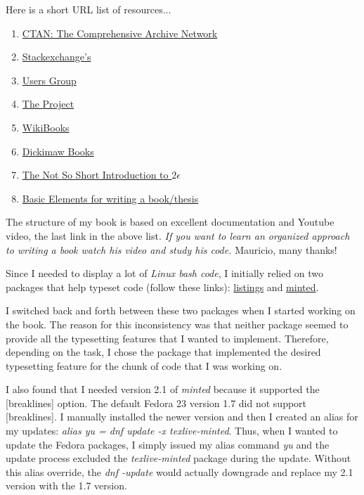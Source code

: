 Here is a short URL list of \latex resources...

\begin{enumerate}
	\item{\href{https://www.ctan.org/}{CTAN: The Comprehensive \tex Archive Network}}
	\item{\href{https://tex.stackexchange.com/}{Stackexchange's \tex}}
	\item{\href{https://www.tug.org/}{\tex Users Group}}
	\item{\href{https://www.latex-project.org/}{The \latex Project}}
	\item{\href{https://en.wikibooks.org/wiki/LaTeX}{\latex WikiBooks}}
	\item{\href{http://www.dickimaw-books.com/latexresources.html}{Dickimaw Books \latex}}
	\item{\href{http://mirror.its.dal.ca/ctan/info/lshort/english/}{The Not So Short Introduction to \latex\begin{math}2\epsilon\end{math}}}
	\item{\href{https://www.youtube.com/watch?v=Qjp-a2uZWZc}{\latex Basic Elements for writing a book/thesis}}
\end{enumerate}

The structure of my book is based on  excellent documentation and Youtube video, the last link in the above list. \textit{If you want to learn an organized approach to writing a \latex book watch his video and study his code.} Mauricio, many thanks!

Since I needed to display a lot of \emph{Linux bash code}, I initially relied on two \latex packages that help typeset code (follow these links): \href{https://www.ctan.org/pkg/listings?lang=en}{listings} and  \href{https://www.ctan.org/tex-archive/macros/latex/contrib/minted?lang=en}{minted}. 

I switched back and forth between these two packages when I started working on the book. The reason for this inconsistency was that neither package seemed to provide all the typesetting features that I wanted to implement. Therefore, depending on the task, I chose the package that implemented the desired typesetting feature for the chunk of code that I was working on.

I also found that I needed version 2.1 of \emph{minted} because it supported the [breaklines] option. The default Fedora 23 \latex version 1.7 did not support [breaklines]. I manually installed the newer version and then I created an alias for my updates: \emph{alias yu = dnf update -x texlive-minted}. Thus, when I wanted to update the Fedora packages, I simply issued my alias command \emph{yu} and the update process excluded the \emph{texlive-minted} package during the update. Without this alias override, the \emph{dnf -update} would actually downgrade and replace my 2.1 version with the 1.7 version.\\

